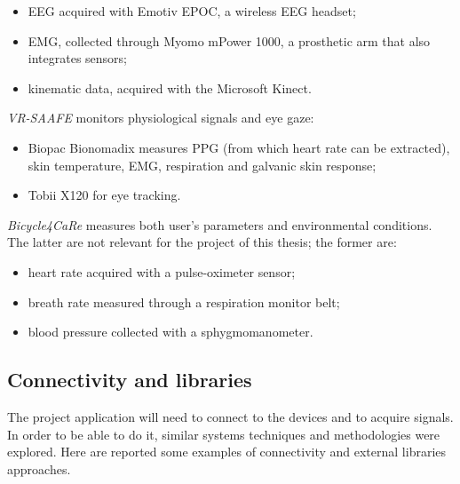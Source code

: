 \documentclass[binding=0.6cm,LaM]{sapthesis}
\begin{document}
\begin{itemize}

\item EEG acquired with Emotiv EPOC, a wireless EEG headset;

\item EMG, collected through Myomo mPower 1000, a prosthetic arm that also integrates sensors;

\item kinematic data, acquired with the Microsoft Kinect. 

\end{itemize}
\textit{VR-SAAFE} monitors physiological signals and eye gaze:

\begin{itemize}

\item Biopac Bionomadix measures PPG (from which heart rate can be extracted), skin temperature, EMG, respiration and galvanic skin response;

\item Tobii X120 for eye tracking. 

\end{itemize}
\textit{Bicycle4CaRe} measures both user's parameters and environmental conditions. The latter are not relevant for the project of this thesis; the former are:

\begin{itemize}

\item heart rate acquired with a pulse-oximeter sensor;

\item breath rate measured through a respiration monitor belt;

\item blood pressure collected with a sphygmomanometer. 

\end{itemize}

\subsection{Connectivity and libraries}
The project application will need to connect to the devices and to acquire signals. In order to be able to do it, similar systems techniques and methodologies were explored. Here are reported some examples of connectivity and external libraries approaches. 
\end{document}
